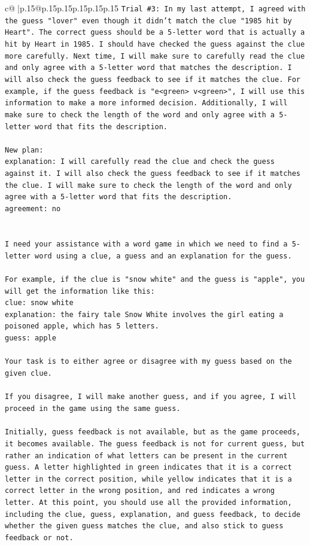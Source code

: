 \documentclass{article}
\begin{document}
{\begin{supertabular}{c@{$\;$}|p{.15\linewidth}@{}p{.15\linewidth}p{.15\linewidth}p{.15\linewidth}p{.15\linewidth}p{.15\linewidth}}
{{{\texttt{Trial \#3: In my last attempt, I agreed with the guess "lover" even though it didn't match the clue "1985 hit by Heart". The correct guess should be a 5{-}letter word that is actually a hit by Heart in 1985. I should have checked the guess against the clue more carefully. Next time, I will make sure to carefully read the clue and only agree with a 5{-}letter word that matches the description. I will also check the guess feedback to see if it matches the clue. For example, if the guess feedback is "e<green> v<green>", I will use this information to make a more informed decision. Additionally, I will make sure to check the length of the word and only agree with a 5{-}letter word that fits the description. } \\
\\ 
\texttt{New plan: } \\
\texttt{explanation: I will carefully read the clue and check the guess against it. I will also check the guess feedback to see if it matches the clue. I will make sure to check the length of the word and only agree with a 5{-}letter word that fits the description.} \\
\texttt{agreement: no} \\
\\ 
\\ 
\texttt{I need your assistance with a word game in which we need to find a 5{-}letter word using a clue, a guess and an explanation for the guess.} \\
\\ 
\texttt{For example, if the clue is "snow white" and the guess is "apple", you will get the information like this:} \\
\texttt{clue: snow white} \\
\texttt{explanation: the fairy tale Snow White involves the girl eating a poisoned apple, which has 5 letters.} \\
\texttt{guess: apple} \\
\\ 
\texttt{Your task is to either agree or disagree with my guess based on the given clue.} \\
\\ 
\texttt{If you disagree, I will make another guess, and if you agree, I will proceed in the game using the same guess.} \\
\\ 
\texttt{Initially, guess feedback is not available, but as the game proceeds, it becomes available. The guess feedback is not for current guess, but rather an indication of what letters can be present in the current guess. A letter highlighted in green indicates that it is a correct letter in the correct position, while yellow indicates that it is a correct letter in the wrong position, and red indicates a wrong letter. At this point, you should use all the provided information, including the clue, guess, explanation, and guess feedback, to decide whether the given guess matches the clue, and also stick to guess feedback or not.} \\
}}}
\end{supertabular}}
\end{document}
